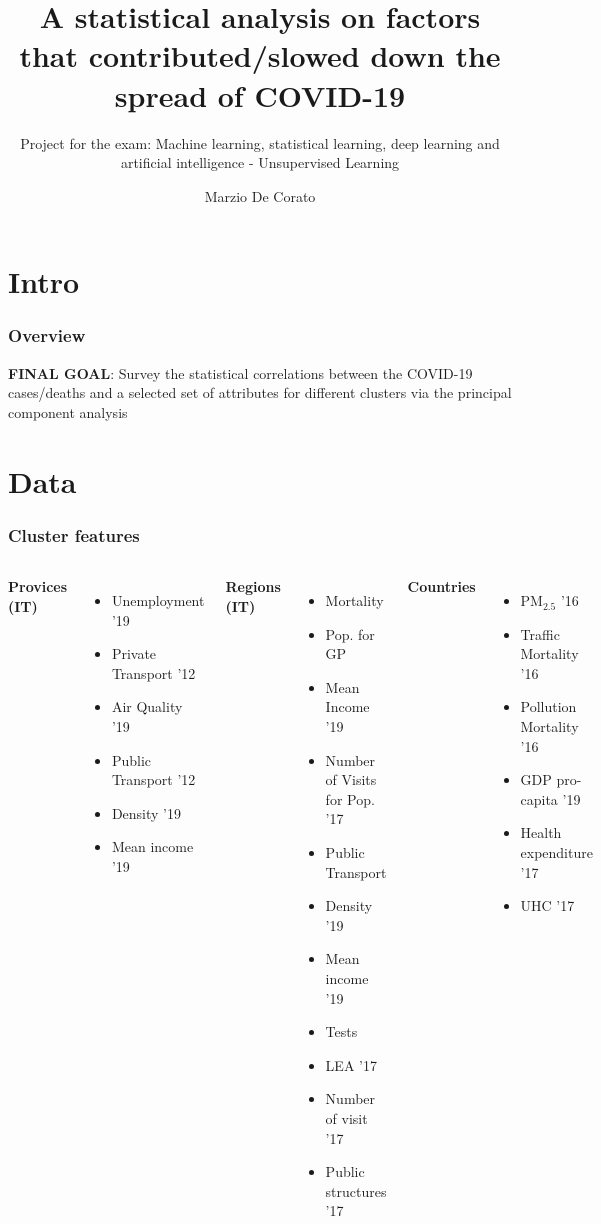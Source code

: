 \documentclass[compress]{beamer}
\title[COVID-19 - Unsupervised Learning]{A statistical analysis on factors that contributed/slowed down the spread of COVID-19}
\author{Marzio De Corato}
\subtitle{Project for the exam: Machine learning, statistical
learning, deep learning and artificial intelligence - Unsupervised Learning}
\begin{document}
\frame{\titlepage}

\section{Intro}

\begin{frame}
\frametitle{Overview}
\textbf{FINAL GOAL}: Survey the statistical correlations between the COVID-19 cases/deaths and a selected set of attributes for different clusters via the principal component analysis

\end{frame}

\section{Data}

\begin{frame}
\frametitle{Cluster features}
\begin{columns}
\textbf{Provices (IT)}
\begin{itemize}
\item Unemployment '19
\item Private Transport '12 
\item Air Quality '19
\item Public Transport '12
\item Density '19
\item Mean income '19
\end{itemize}
\textbf{Regions (IT)}
\begin{itemize}
\item Mortality
\item Pop. for GP
\item Mean Income '19
\item Number of Visits for Pop. '17
\item Public Transport 
\item Density '19
\item Mean income '19
\item Tests 
\item LEA '17
\item Number of visit '17
\item Public structures '17
\end{itemize}
\textbf{Countries}
\begin{itemize}
\item PM$_{2.5}$ '16
\item Traffic Mortality '16
\item Pollution Mortality '16
\item GDP pro-capita '19
\item Health expenditure '17
\item UHC '17
\end{itemize}
\end{columns}
\end{frame}
\end{document}
